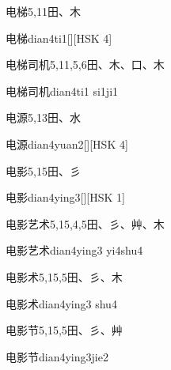 \begin{entry}{电梯}{5,11}{⽥、⽊}
  \begin{phonetics}{电梯}{dian4ti1}[][HSK 4]
  \end{phonetics}
\end{entry}

\begin{entry}{电梯司机}{5,11,5,6}{⽥、⽊、⼝、⽊}
  \begin{phonetics}{电梯司机}{dian4ti1 si1ji1}
  \end{phonetics}
\end{entry}

\begin{entry}{电源}{5,13}{⽥、⽔}
  \begin{phonetics}{电源}{dian4yuan2}[][HSK 4]
  \end{phonetics}
\end{entry}

\begin{entry}{电影}{5,15}{⽥、⼺}
  \begin{phonetics}{电影}{dian4ying3}[][HSK 1]
  \end{phonetics}
\end{entry}

\begin{entry}{电影艺术}{5,15,4,5}{⽥、⼺、⾋、⽊}
  \begin{phonetics}{电影艺术}{dian4ying3 yi4shu4}
  \end{phonetics}
\end{entry}

\begin{entry}{电影术}{5,15,5}{⽥、⼺、⽊}
  \begin{phonetics}{电影术}{dian4ying3 shu4}
  \end{phonetics}
\end{entry}

\begin{entry}{电影节}{5,15,5}{⽥、⼺、⾋}
  \begin{phonetics}{电影节}{dian4ying3jie2}
  \end{phonetics}
\end{entry}


